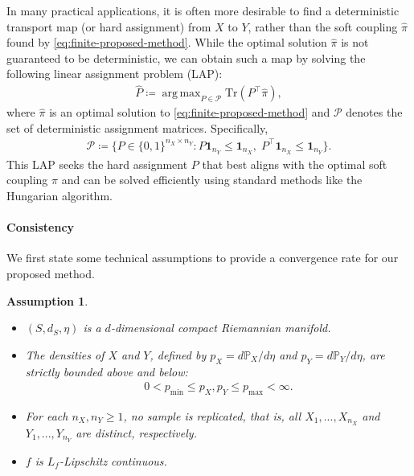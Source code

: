 \documentclass{article}
\newtheorem{assumption}{Assumption}
\DeclareMathOperator*{\argmax}{arg\,max}
\begin{document}
In many practical applications, it is often more desirable to find a deterministic transport map (or hard assignment) from $X$ to $Y$, rather than the soft coupling $\hat{\pi}$ found by \eqref{eq:finite-proposed-method}. While the optimal solution $\hat{\pi}$ is not guaranteed to be deterministic, we can obtain such a map by solving the following linear assignment problem (LAP):
\begin{align}
	\label{eq:finite-projection-method}
	\hat{P} \coloneqq \argmax_{P \in \mathcal{P}} \mathrm{Tr}(P^\top\hat{\pi}) ,
\end{align}
where $\hat{\pi}$ is an optimal solution to \eqref{eq:finite-proposed-method} and $\mathcal{P}$ denotes the set of deterministic assignment matrices. Specifically, 
\begin{align}
	\label{eq:assign-matrix-space}
	\mathcal{P} \coloneqq \{P \in \{0,1\}^{n_X \times n_Y}: P\mathbf{1}_{n_Y} \leq \mathbf{1}_{n_X}, \; P^\top\mathbf{1}_{n_X} \leq \mathbf{1}_{n_Y}\} .
\end{align}
This LAP seeks the hard assignment $P$ that best aligns with the optimal soft coupling $\hat{\pi}$ and can be solved efficiently using standard methods like the Hungarian algorithm.



\paragraph{Consistency}
We first state some technical assumptions to provide a convergence rate for our proposed method.
\begin{assumption}
	\label{ass:consistency}
	$ $
	\begin{itemize}
		\item[(A1)] $(S,d_S,\eta)$ is a $d$-dimensional compact Riemannian manifold.
		\item[(A2)] The densities of $X$ and $Y$, defined by $p_X = d\mathbb{P}_X/d\eta$ and $p_Y = d\mathbb{P}_Y/d\eta$, are strictly bounded above and below:
		\begin{align*}
			0 < p_{\min} \leq p_X,p_Y \leq p_{\max} < \infty .
		\end{align*}
		\item[(A3)] For each $n_X,n_Y \geq 1$, no sample is replicated, that is, all $X_1,...,X_{n_X}$ and $Y_1,...,Y_{n_Y}$ are distinct, respectively.
		\item[(A4)] $f$ is $L_f$-Lipschitz continuous.
	\end{itemize}
\end{assumption}
\end{document}
